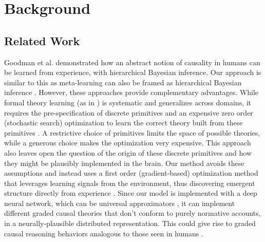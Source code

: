 \section{Background}

\subsection{Related Work }

Goodman et al. \citep{goodman2011learning} demonstrated how an abstract notion of causality in humans can be learned from experience, with hierarchical Bayesian inference. Our approach is similar to this as meta-learning can also be framed as hierarchical Bayesian inference \citep{grant2018recasting}. However, these approaches provide complementary advantages. While formal theory learning (as in \cite{goodman2011learning}) is systematic and generalizes across domains, it requires the pre-specification of discrete primitives and an expensive zero order (stochastic search) optimization to learn the correct theory built from these primitives \citep{schulz2012finding, bramley2018grounding}. A restrictive choice of primitives limits the space of possible theories, while a generous choice makes the optimization very expensive. This approach also leaves open the question of the origin of these discrete primitives and how they might be plausibly implemented in the brain. Our method avoids these assumptions and instead uses a first order (gradient-based) optimization method that leverages learning signals from the environment, thus discovering emergent structure directly from experience \citep{mcclelland2010letting}.
Since our model is implemented with a deep neural network, which can be universal approximators \citep{siegelmann1995computational, hornik1991approximation}, it can implement different graded causal theories that don't conform to purely normative accounts, in a neurally-plausible distributed representation.  This could give rise to graded causal reasoning behaviors analogous to those seen in humans \citep{rehder2014independence, rehder2017failures, fernbach2010neglect, fernbach2013cognitive} . 


